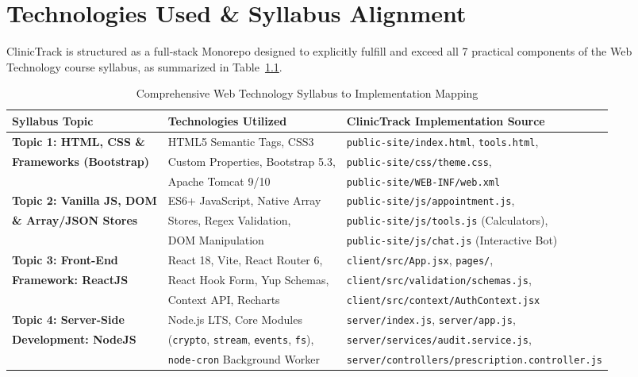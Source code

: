 \documentclass[12pt,a4paper,oneside]{report}
\begin{document}
\chapter{Technologies Used \& Syllabus Alignment}

ClinicTrack is structured as a full-stack Monorepo designed to explicitly fulfill and exceed all 7 practical components of the Web Technology course syllabus, as summarized in Table~\ref{tab:tech_stack_mapping}.

\begin{table}[h!]
\centering
\caption{Comprehensive Web Technology Syllabus to Implementation Mapping}
\label{tab:tech_stack_mapping}
\small
\begin{tabularx}{\textwidth}{l p{4.2cm} X}
\toprule
\textbf{Syllabus Topic} & \textbf{Technologies Utilized} & \textbf{ClinicTrack Implementation Source} \\
\midrule
\textbf{Topic 1: HTML, CSS \&} & HTML5 Semantic Tags, CSS3 & \texttt{public-site/index.html}, \texttt{tools.html}, \\
\textbf{Frameworks (Bootstrap)} & Custom Properties, Bootstrap 5.3, & \texttt{public-site/css/theme.css}, \\
& Apache Tomcat 9/10 & \texttt{public-site/WEB-INF/web.xml} \\
\midrule
\textbf{Topic 2: Vanilla JS, DOM} & ES6+ JavaScript, Native Array & \texttt{public-site/js/appointment.js}, \\
\textbf{\& Array/JSON Stores} & Stores, Regex Validation, & \texttt{public-site/js/tools.js} (Calculators), \\
& DOM Manipulation & \texttt{public-site/js/chat.js} (Interactive Bot) \\
\midrule
\textbf{Topic 3: Front-End} & React 18, Vite, React Router 6, & \texttt{client/src/App.jsx}, \texttt{pages/}, \\
\textbf{Framework: ReactJS} & React Hook Form, Yup Schemas, & \texttt{client/src/validation/schemas.js}, \\
& Context API, Recharts & \texttt{client/src/context/AuthContext.jsx} \\
\midrule
\textbf{Topic 4: Server-Side} & Node.js LTS, Core Modules & \texttt{server/index.js}, \texttt{server/app.js}, \\
\textbf{Development: NodeJS} & (\texttt{crypto}, \texttt{stream}, \texttt{events}, \texttt{fs}), & \texttt{server/services/audit.service.js}, \\
& \texttt{node-cron} Background Worker & \texttt{server/controllers/prescription.controller.js} \\

\end{tabularx}
\end{table}
\end{document}
